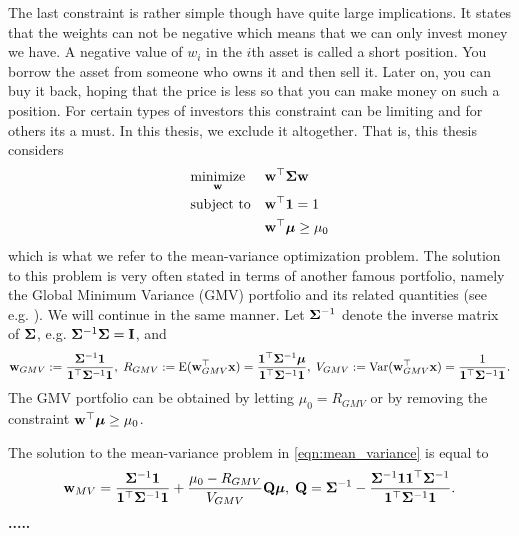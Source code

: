 \documentclass[]{book}\usepackage{knitr}
\begin{document}
The last constraint is rather simple though have quite large implications. 
It states that the weights can not be negative which means that we can only invest money we have. 
A negative value of $w_i$ in the $i$th asset is called a short position.
You borrow the asset from someone who owns it and then sell it. 
Later on, you can buy it back, hoping that the price is less so that you can make money on such a position. 
For certain types of investors this constraint can be limiting and for others its a must.
In this thesis, we exclude it altogether. That is, this thesis considers
\begin{equation}\label{eqn:mean_variance}
\begin{aligned}
& \underset{\mathbf{w}}{\text{minimize}} 
& & \mathbf{w}^\top \mathbf{\Sigma} \mathbf{w} \\
& \text{subject to}
& & \mathbf{w}^\top \mathbf{1} = 1 \\
& && \mathbf{w}^\top \mbox{\boldmath$\mu$} \geq \mu_0 \\
\end{aligned}
\end{equation}
which is what we refer to the mean-variance optimization problem. The solution to this problem is very often stated in terms of another famous portfolio, namely the Global Minimum Variance (GMV) portfolio and its related quantities (see e.g. \citet{Bodnar2009CaIotEFiEM, bodnar2013equivalence, bauder2018bayesian}). We will continue in the same manner. Let $\mathbf{\Sigma}^{-1}$ denote the inverse matrix of $\mathbf{\Sigma}$, e.g. $\mathbf{\Sigma}^{-1}\mathbf{\Sigma} = \mathbf{I}$, and
\begin{equation}
	\mathbf{w}_{GMV} := \frac{\mathbf{\Sigma}^{-1}\mathbf{1}}{\mathbf{1}^\top \mathbf{\Sigma}^{-1}\mathbf{1}}, \; R_{GMV} :=\operatorname{E}(\mathbf{w}_{GMV}^\top\mathbf{x}) = \frac{\mathbf{1}^\top\mathbf{\Sigma}^{-1}\mbox{\boldmath$\mu$}}{\mathbf{1}^\top \mathbf{\Sigma}^{-1}\mathbf{1}}, \;
	V_{GMV} := \operatorname{Var}(\mathbf{w}_{GMV}^\top\mathbf{x}) =\frac{1}{\mathbf{1}^\top \mathbf{\Sigma}^{-1}\mathbf{1}}.
\end{equation}
The GMV portfolio can be obtained by letting $\mu_0=R_{GMV}$ or by removing the constraint $\mathbf{w}^\top \mbox{\boldmath$\mu$} \geq \mu_0$. 
  
The solution to the mean-variance problem in \eqref{eqn:mean_variance} is equal to
\begin{equation}\label{eqn:mean_var_solution}
	\mathbf{w}_{MV} = \frac{\mathbf{\Sigma}^{-1}\mathbf{1}}{\mathbf{1}^\top \mathbf{\Sigma}^{-1}\mathbf{1}} + \frac{\mu_0 - R_{GMV}}{V_{GMV}} \mathbf{Q} \mbox{\boldmath$\mu$},\; \mathbf{Q} = \mathbf{\Sigma}^{-1} - \frac{\mathbf{\Sigma}^{-1} \mathbf{1} \mathbf{1}^\top \mathbf{\Sigma}^{-1}}{\mathbf{1}^\top \mathbf{\Sigma}^{-1} \mathbf{1}}.
\end{equation}
\textbf{.....}
\end{document}
